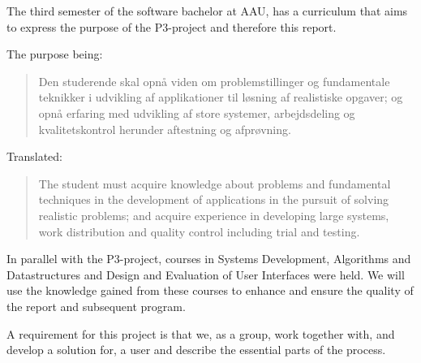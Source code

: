 The third semester of the software bachelor at AAU, has a curriculum that aims to express the purpose of the P3-project and therefore this report.

The purpose being:
\begin{quotation}
Den studerende skal opnå viden om problemstillinger og fundamentale teknikker i udvikling af applikationer til løsning af realistiske opgaver; og opnå erfaring med udvikling af store systemer, arbejdsdeling og kvalitetskontrol herunder aftestning og afprøvning.
\end{quotation}

Translated:
\begin{quotation}
The student must acquire knowledge about problems and fundamental techniques in the development of applications in the pursuit of solving realistic problems; and acquire experience in developing large systems, work distribution and quality control including trial and testing.
\end{quotation}

In parallel with the P3-project, courses in Systems Development, Algorithms and Datastructures and Design and Evaluation of User Interfaces were held. We will use the knowledge gained from these courses to enhance and ensure the quality of the report and subsequent program.

A requirement for this project is that we, as a group, work together with, and develop a solution for, a user and describe the essential parts of the process.
